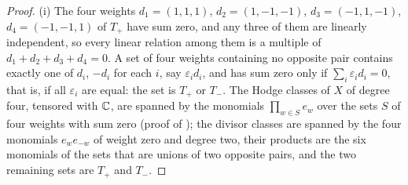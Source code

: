 \begin{proof}
(i) The four weights $d_{1}=(1,1,1)$, $d_{2}=(1,-1,-1)$, $d_{3}=(-1,1,-1)$,
$d_{4}=(-1,-1,1)$ of $T_{+}$ have sum zero, and any three of them are
linearly independent, so every linear relation among them is a multiple of
$d_{1}+d_{2}+d_{3}+d_{4}=0$. A set of four weights containing no opposite
pair contains exactly one of $d_{i}$, $-d_{i}$ for each $i$, say
$\varepsilon_{i}d_{i}$, and has sum zero only if
$\sum_{i}\varepsilon_{i}d_{i}=0$, that is, if all $\varepsilon_{i}$ are
equal: the set is $T_{+}$ or $T_{-}$. The Hodge classes of $X$ of degree
four, tensored with $\mathbb{C}$, are spanned by the monomials $\prod_{w\in S}e_{w}$
over the sets $S$ of four weights with sum zero (proof of
); the divisor classes are spanned by the four monomials
$e_{w}e_{-w}$ of weight zero and degree two, their products are the six
monomials of the sets that are unions of two opposite pairs, and the two
remaining sets are $T_{+}$ and $T_{-}$.


\end{proof}
